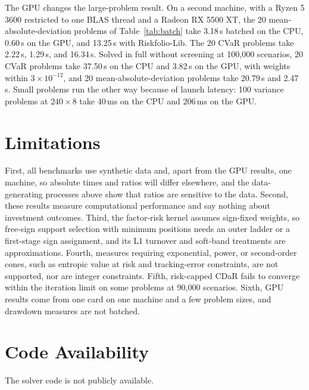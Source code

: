 \documentclass[10pt,twocolumn,letterpaper]{article}
\begin{document}
The GPU changes the large-problem result. On a second machine, with a Ryzen 5 3600 restricted to one BLAS thread and a Radeon RX 5500 XT, the 20 mean-absolute-deviation problems of Table~\ref{tab:batch} take 3.18\,s batched on the CPU, 0.60\,s on the GPU, and 13.25\,s with Riskfolio-Lib. The 20 CVaR problems take 2.22\,s, 1.29\,s, and 16.34\,s. Solved in full without screening at 100,000 scenarios, 20 CVaR problems take 37.50\,s on the CPU and 3.82\,s on the GPU, with weights within $3 \times 10^{-12}$, and 20 mean-absolute-deviation problems take 20.79\,s and 2.47\,s. Small problems run the other way because of launch latency: 100 variance problems at $240 \times 8$ take 40\,ms on the CPU and 206\,ms on the GPU.

\section{Limitations}

First, all benchmarks use synthetic data and, apart from the GPU results, one machine, so absolute times and ratios will differ elsewhere, and the data-generating processes above show that ratios are sensitive to the data. Second, these results measure computational performance and say nothing about investment outcomes. Third, the factor-risk kernel assumes sign-fixed weights, so free-sign support selection with minimum positions needs an outer ladder or a first-stage sign assignment, and its L1 turnover and soft-band treatments are approximations. Fourth, measures requiring exponential, power, or second-order cones, such as entropic value at risk and tracking-error constraints, are not supported, nor are integer constraints. Fifth, risk-capped CDaR fails to converge within the iteration limit on some problems at 90,000 scenarios. Sixth, GPU results come from one card on one machine and a few problem sizes, and drawdown measures are not batched.

\section*{Code Availability}

The solver code is not publicly available.

\vspace{4pt}
\end{document}
